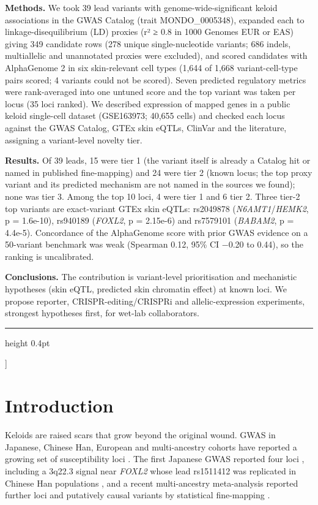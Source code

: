 \documentclass[10pt,twocolumn,a4paper]{article}
\begin{document}
{\begin{@twocolumnfalse}
\begin{minipage}[t]{0.735\textwidth}
\textbf{Methods.} We took 39 lead variants with genome-wide-significant keloid associations in the GWAS Catalog (trait MONDO\_0005348), expanded each to linkage-disequilibrium (LD) proxies (r² ≥ 0.8 in 1000 Genomes EUR or EAS) giving 349 candidate rows (278 unique single-nucleotide variants; 686 indels, multiallelic and unannotated proxies were excluded), and scored candidates with AlphaGenome 2 in six skin-relevant cell types (1,644 of 1,668 variant-cell-type pairs scored; 4 variants could not be scored). Seven predicted regulatory metrics were rank-averaged into one untuned score and the top variant was taken per locus (35 loci ranked). We described expression of mapped genes in a public keloid single-cell dataset (GSE163973; 40,655 cells) and checked each locus against the GWAS Catalog, GTEx skin eQTLs, ClinVar and the literature, assigning a variant-level novelty tier.

\textbf{Results.} Of 39 leads, 15 were tier 1 (the variant itself is already a Catalog hit or named in published fine-mapping) and 24 were tier 2 (known locus; the top proxy variant and its predicted mechanism are not named in the sources we found); none was tier 3. Among the top 10 loci, 4 were tier 1 and 6 tier 2. Three tier-2 top variants are exact-variant GTEx skin eQTLs: rs2049878 (\emph{N6AMT1}/\emph{HEMK2}, p = 1.6e-10), rs940189 (\emph{FOXL2}, p = 2.15e-6) and rs7579101 (\emph{BABAM2}, p = 4.4e-5). Concordance of the AlphaGenome score with prior GWAS evidence on a 50-variant benchmark was weak (Spearman 0.12, 95\% CI −0.20 to 0.44), so the ranking is uncalibrated.

\textbf{Conclusions.} The contribution is variant-level prioritisation and mechanistic hypotheses (skin eQTL, predicted skin chromatin effect) at known loci. We propose reporter, CRISPR-editing/CRISPRi and allelic-expression experiments, strongest hypotheses first, for wet-lab collaborators.
\end{minipage}
\vspace{6pt}\hrule height 0.4pt\vspace{14pt}
\end{@twocolumnfalse}}]

\section{Introduction}

Keloids are raised scars that grow beyond the original wound. GWAS in Japanese, Chinese Han, European and multi-ancestry cohorts have reported a growing set of susceptibility loci \cite{k1,k2,k3,k14,k15,k16,k17}. The first Japanese GWAS reported four loci \cite{k2}, including a 3q22.3 signal near \emph{FOXL2} whose lead rs1511412 was replicated in Chinese Han populations \cite{k3,k4,k5}, and a recent multi-ancestry meta-analysis reported further loci and putatively causal variants by statistical fine-mapping \cite{k1}.
\end{document}
